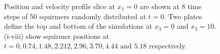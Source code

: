 \begin{figure}
\begin{subfigure}[b]{0.42\textwidth}
    \caption[]{\label{fig:squirmerH}}
\end{subfigure}
\label{fig:SquiremerGyro}
\caption[Position and velocity profile at 8 time steps of 50 squirmers randomly distributed at t=0.]{Position and velocity profile slice at $x_1=0$ are shown at 8 time steps of 50 squirmers randomly distributed at $t=0$. Two plates define the top and bottom of the simulations at $x_3 = 0$ and  $x_3 = 10$. (i-viii) show squirmer positions at $t = 0, 0.74, 1.48, 2.212, 2.96, 3.70, 4.44 \text{ and } 5.18$ respectively.}
\end{figure}
